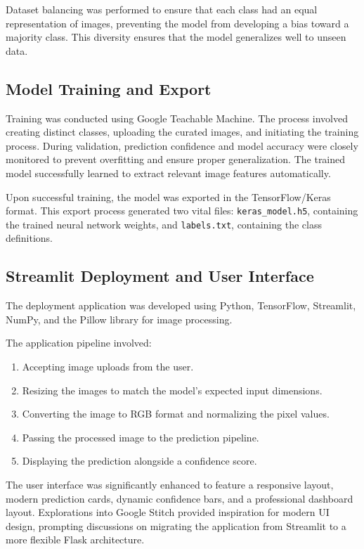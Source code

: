 Dataset balancing was performed to ensure that each class had an equal representation of images, preventing the model from developing a bias toward a majority class. This diversity ensures that the model generalizes well to unseen data.

\subsection{Model Training and Export}

Training was conducted using \cite{google_teachable} Google Teachable Machine. The process involved creating distinct classes, uploading the curated images, and initiating the training process. During validation, prediction confidence and model accuracy were closely monitored to prevent overfitting and ensure proper generalization. The trained model successfully learned to extract relevant image features automatically.

Upon successful training, the model was exported in the TensorFlow/Keras format. This export process generated two vital files: \texttt{keras\_model.h5}, containing the trained neural network weights, and \texttt{labels.txt}, containing the class definitions.

\subsection{Streamlit Deployment and User Interface}

The deployment application was developed using Python, \cite{tensorflow} TensorFlow, Streamlit, NumPy, and the Pillow library for image processing.

The application pipeline involved:
\begin{enumerate}[leftmargin=1.5cm]
    \item Accepting image uploads from the user.
    \item Resizing the images to match the model's expected input dimensions.
    \item Converting the image to RGB format and normalizing the pixel values.
    \item Passing the processed image to the prediction pipeline.
    \item Displaying the prediction alongside a confidence score.
\end{enumerate}

The user interface was significantly enhanced to feature a responsive layout, modern prediction cards, dynamic confidence bars, and a professional dashboard layout. Explorations into \cite{google_stitch} Google Stitch provided inspiration for modern UI design, prompting discussions on migrating the application from Streamlit to a more flexible Flask architecture.

